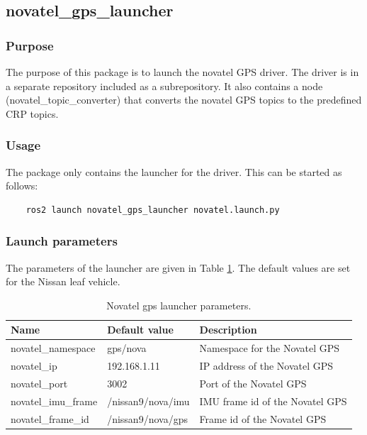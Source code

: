 \documentclass[sn-mathphys-num]{sn-jnl}%
\begin{document}
\subsection{novatel\_gps\_launcher}
\subsubsection{Purpose}
The purpose of this package is to launch the novatel GPS driver. The driver is in a separate repository included as a subrepository. It also contains a node (novatel\_topic\_converter) that converts the novatel GPS topics to the predefined CRP topics.
\subsubsection{Usage}
The package only contains the launcher for the driver. This can be started as follows:
\begin{lstlisting}
    ros2 launch novatel_gps_launcher novatel.launch.py
\end{lstlisting}
\subsubsection{Launch parameters}
The parameters of the launcher are given in Table \ref{tab:novatel_gps_launcher}. The default values are set for the Nissan leaf vehicle.
\begin{table}[!h]
    \captionsetup{justification=centering}
    \normalsize
    \caption{\label{tab:novatel_gps_launcher} Novatel gps launcher parameters.}
    \begin{tabular}{| l | l | l |}
        \hline
        \textbf{Name} & \textbf{Default value} & \textbf{Description} \\
        \hline
        novatel\_namespace  & gps/nova          & Namespace for the Novatel GPS \\
        \hline
        novatel\_ip         & 192.168.1.11      & IP address of the Novatel GPS \\
        \hline
        novatel\_port       & 3002              & Port of the Novatel GPS \\
        \hline
        novatel\_imu\_frame & /nissan9/nova/imu & IMU frame id of the Novatel GPS \\
        \hline
        novatel\_frame\_id  & /nissan9/nova/gps & Frame id of the Novatel GPS \\
        \hline
    \end{tabular}
\end{table}
\end{document}
